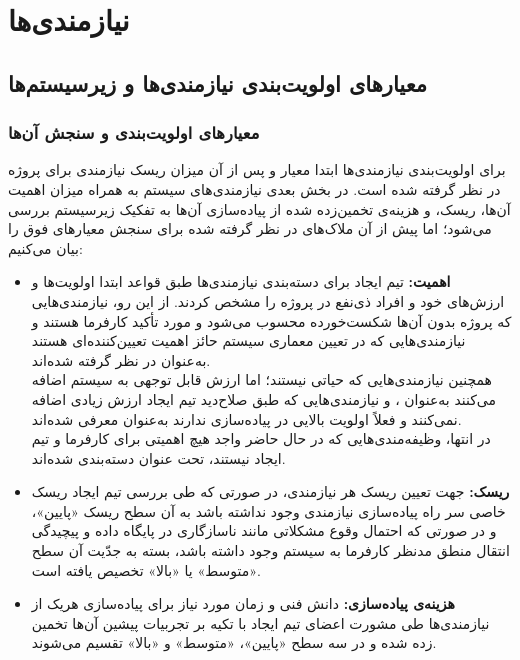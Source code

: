 \chapter{نیازمندی‌ها}

\section{معیارهای اولویت‌بندی نیازمندی‌ها و زیرسیستم‌ها}

\subsection{معیارهای اولویت‌بندی و سنجش آن‌ها}

 برای اولویت‌بندی نیازمندی‌ها ابتدا معیار 
و پس از آن میزان ریسک نیازمندی برای پروژه در نظر گرفته شده است. 
در بخش بعدی نیازمندی‌های سیستم به همراه میزان اهمیت آن‌ها، ریسک، و هزینه‌ی تخمین‌زده شده از پیاده‌سازی آن‌ها به تفکیک زیرسیستم بررسی می‌شود؛ اما پیش از آن ملاک‌های در نظر گرفته شده برای سنجش معیارهای فوق را بیان می‌کنیم:

\begin{itemize}
	\item \textbf{اهمیت:}
	تیم ایجاد برای دسته‌بندی نیازمندی‌ها طبق قواعد
	ابتدا اولویت‌ها و ارزش‌های خود و افراد ذی‌نفع‌ در پروژه را مشخص کردند. از این رو، نیازمندی‌هایی که پروژه بدون آن‌ها شکست‌خورده محسوب می‌شود و مورد تأکید کارفرما هستند و نیازمندی‌هایی که در تعیین معماری سیستم حائز اهمیت تعیین‌کننده‌ای هستند به‌عنوان
	در نظر گرفته شده‌اند. \\
	همچنین نیازمندی‌هایی که حیاتی نیستند؛ اما ارزش قابل توجهی به سیستم اضافه می‌کنند به‌عنوان
		،
	و نیازمندی‌هایی که طبق صلاح‌دید تیم ایجاد ارزش زیادی اضافه نمی‌کنند و فعلاً اولویت بالایی در پیاده‌سازی ندارند به‌عنوان
	معرفی شده‌اند. \\
	در انتها، وظیفه‌مندی‌هایی که در حال حاضر واجد هیچ اهمیتی برای کارفرما و تیم ایجاد نیستند، تحت عنوان
	دسته‌بندی شده‌اند.
	\item \textbf{ریسک:}
	جهت تعیین ریسک هر نیازمندی، در صورتی که طی بررسی تیم ایجاد ریسک خاصی سر راه پیاده‌سازی نیازمندی وجود نداشته باشد به آن سطح ریسک «پایین»، و در صورتی که احتمال وقوع مشکلاتی مانند ناسازگاری در پایگاه داده
	و پیچیدگی انتقال منطق مدنظر کارفرما به سیستم وجود داشته باشد، بسته به جدّیت آن سطح «متوسط» یا «بالا» تخصیص یافته است.
	\item \textbf{هزینه‌ی پیاده‌سازی:}
	دانش فنی و زمان مورد نیاز برای پیاده‌سازی هریک از نیازمندی‌ها طی مشورت اعضای تیم ایجاد با تکیه بر تجربیات پیشین آن‌ها تخمین زده شده و در سه سطح «پایین»، «متوسط» و «بالا» تقسیم می‌شوند.
\end{itemize}


